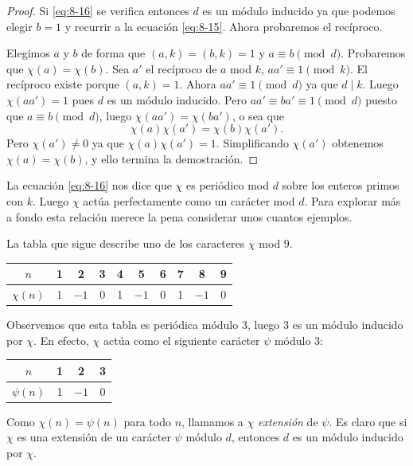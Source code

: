\documentclass[12pt,a4paper]{book}
\begin{document}
    \begin{proof}
        Si \eqref{eq:8-16} se verifica entonces $d$ es un módulo inducido ya que podemos
        elegir $b=1$ y recurrir a la ecuación \eqref{eq:8-15}. Ahora probaremos el
        recíproco.

        Elegimos $a$ y $b$ de forma que $(a,k)=(b,k)=1$ y $a\equiv b\pmod{d}$. Probaremos
        que $\chi(a)=\chi(b)$. Sea $a'$ el recíproco de $a$ mod $k$, $aa'\equiv1\pmod{k}$.
        El recíproco existe porque $(a,k)=1$. Ahora $aa'\equiv1\pmod{d}$ ya que $d\mid k$.
        Luego $\chi(aa')=1$ pues $d$ es un módulo inducido. Pero
        $aa'\equiv ba'\equiv1\pmod{d}$ puesto que $a\equiv b\pmod{d}$, luego
        $\chi(aa')=\chi(ba')$, o sea que
        \begin{equation*}
            \chi(a)\chi(a')=\chi(b)\chi(a').
        \end{equation*}
        Pero $\chi(a')\neq0$ ya que $\chi(a)\chi(a')=1$. Simplificando $\chi(a')$ obtenemos
        $\chi(a)=\chi(b)$, y ello termina la demostración.
    \end{proof}

    La ecuación \eqref{eq:8-16} nos dice que $\chi$ es periódico mod $d$ sobre los enteros
    primos con $k$. Luego $\chi$ actúa perfectamente como un carácter mod $d$. Para explorar
    más a fondo esta relación merece la pena considerar unos cuantos ejemplos.

    \begin{ejemplo}
        La tabla que sigue describe uno de los caracteres $\chi$ mod 9.
        \begin{center}
            \begin{tabular}{c|ccccccccc}
                $n$&1&2&3&4&5&6&7&8&9\\\hline
                $\chi(n)$&1&$-1$&0&1&$-1$&0&1&$-1$&0
            \end{tabular}
        \end{center}
        Observemos que esta tabla es periódica módulo 3, luego 3 es un módulo inducido por
        $\chi$. En efecto, $\chi$ actúa como el siguiente carácter $\psi$ módulo 3:
        \begin{center}
            \begin{tabular}{c|ccc}
                $n$&1&2&3\\\hline
                $\psi(n)$&1&$-1$&0
            \end{tabular}
        \end{center}
        Como $\chi(n)=\psi(n)$ para todo $n$, llamamos a $\chi$ \textit{extensión} de
        $\psi$. Es claro que si $\chi$ es una extensión de un carácter $\psi$ módulo $d$,
        entonces $d$ es un módulo inducido por $\chi$.
    \end{ejemplo}
\end{document}
